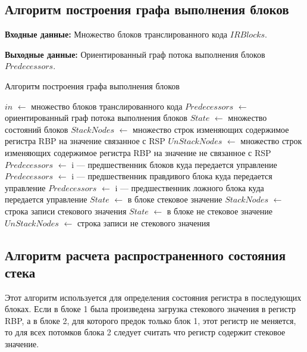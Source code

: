 \subsection{Алгоритм построения графа выполнения блоков}

\textbf{Входные данные:} Множество блоков транслированного кода $IRBlocks$.

\textbf{Выходные данные:} Ориентированный граф потока выполнения блоков $Predecessors$.

\begin{algorithm}[H]
\small
	\caption{Алгоритм построения графа выполнения блоков}
	\label{alg:graph}
	\begin{algorithmic}[1]
		\State $in$ $\gets$ множество блоков транслированного кода
		\State $Predecessors$ $\gets$ ориентированный граф потока выполнения блоков
		\State $State$ $\gets$ множество состояний блоков
		\State $StackNodes$ $\gets$ множество строк изменяющих содержимое регистра RBP на значение связанное с RSP
		\State $UnStackNodes$ $\gets$ множество строк изменяющих содержимое регистра RBP на значение не связанное с RSP
		\State $Predecessors$ $\gets$ i --- предшественник блоков куда передается управление
		\EndIf
		\State $Predecessors$ $\gets$ i --- предшественник правдивого блока куда передается управление
		\State $Predecessors$ $\gets$ i --- предшественник ложного блока куда передается управление
		\EndIf
		\State $State$ $\gets$ в блоке стековое значение
		\State $StackNodes$ $\gets$ строка записи стекового значения
		\Else
		\State $State$ $\gets$ в блоке не стековое значение
		\State $UnStackNodes$ $\gets$ строка записи не стекового значения
		\EndIf
		\EndIf
		\EndFor
		\EndFor
	\end{algorithmic}
\end{algorithm}

\subsection{Алгоритм расчета распространенного состояния стека}

Этот алгоритм используется для определения состояния регистра в последующих блоках. Если в блоке 1 была произведена загрузка стекового значения в регистр RBP, а в блоке 2, для которого предок только блок 1, этот регистр не меняется, то для всех потомков блока 2 следует считать что регистр содержит стековое значение.

